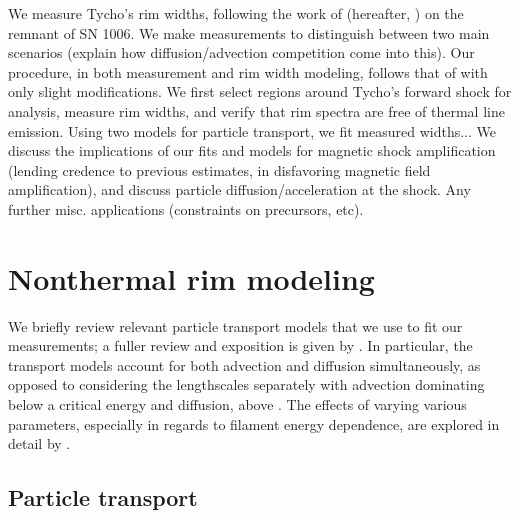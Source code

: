 \documentclass[iop, apj, numberedappendix, twocolappendix]{emulateapj}
\begin{document}
We measure Tycho's rim widths, following the work of \citet{ressler2014}
(hereafter, ) on the remnant of SN 1006.
We make measurements to distinguish between two main scenarios
(explain how diffusion/advection competition come into this).
Our procedure, in both measurement and rim width modeling, follows that of
 with only slight modifications.
We first select regions around Tycho's forward shock for analysis, measure
rim widths, and verify that rim spectra are free of thermal line emission.
Using two models for particle transport, we fit measured widths...
We discuss the implications of our fits and models for magnetic shock
amplification (lending credence to previous estimates, in disfavoring magnetic
field amplification), and discuss particle diffusion/acceleration at the shock.
Any further misc. applications (constraints on precursors, etc).


\section{Nonthermal rim modeling}\label{sec:models}

We briefly review relevant particle transport models that we use to fit our
measurements; a fuller review and exposition is given by .
In particular, the transport models
account for both advection and diffusion simultaneously, as opposed to
considering the lengthscales separately with advection dominating below a
critical energy and diffusion, above
\citep{bamba2003, vink2003, yamazaki2004, bamba2005-hist}
.
The effects of varying various parameters, especially in regards to filament
energy dependence, are explored in detail by .


\subsection{Particle transport}\label{sec:transport}
\end{document}
